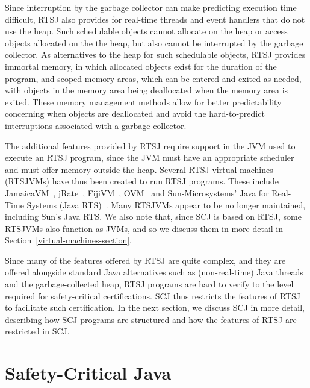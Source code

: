 {Since interruption by the garbage collector can make predicting
execution time difficult, RTSJ also provides for real-time threads and
event handlers that do not use the heap.
Such schedulable objects cannot allocate on the heap or access objects
allocated on the the heap, but also cannot be interrupted by the
garbage collector.
As alternatives to the heap for such schedulable objects, RTSJ
provides immortal memory, in which allocated objects exist for the
duration of the program, and scoped memory areas, which can be entered
and exited as needed, with objects in the memory area being
deallocated when the memory area is exited.
These memory management methods allow for better predictability
concerning when objects are deallocated and avoid the hard-to-predict
interruptions associated with a garbage collector.

The additional features provided by RTSJ require support in the JVM
used to execute an RTSJ program, since the JVM must have an
appropriate scheduler and must offer memory outside the heap.
Several RTSJ virtual machines (RTSJVMs) have thus been created to run
RTSJ programs.
These include JamaicaVM~\cite{aicas2017}, jRate~\cite{angelo2002},
FijiVM~\cite{pizlo2009}, OVM~\cite{armbruster2007} and
Sun-Microsystems' Java for Real-Time Systems (Java
RTS)~\cite{mcenery2007}.
Many RTSJVMs appear to be no longer maintained, including Sun's Java
RTS.
We also note that, since SCJ is based on RTSJ, some RTSJVMs also
function as JVMs, and so we discuss them in more detail in
Section~\ref{virtual-machines-section}.

Since many of the features offered by RTSJ are quite complex, and they
are offered alongside standard Java alternatives such as
(non-real-time) Java threads and the garbage-collected heap, RTSJ
programs are hard to verify to the level required for safety-critical
certifications.
SCJ thus restricts the features of RTSJ to facilitate such
certification.
In the next section, we discuss SCJ in more detail, describing how SCJ
programs are structured and how the features of RTSJ are restricted in
SCJ.
}

\section{Safety-Critical Java}
\label{scj-section}


